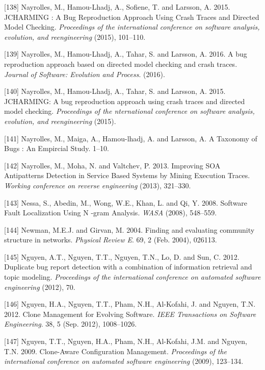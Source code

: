 \documentclass[12pt]{report}
\begin{document}
\hypertarget{ref-Nayrolles2015}{}
{[}138{]} Nayrolles, M., Hamou-Lhadj, A., Sofiene, T. and Larsson, A.
2015. JCHARMING : A Bug Reproduction Approach Using Crash Traces and
Directed Model Checking. \emph{Proceedings of the international
conference on software analysis, evolution, and reengineering} (2015),
101--110.

\hypertarget{ref-Nayrolles2016d}{}
{[}139{]} Nayrolles, M., Hamou-Lhadj, A., Tahar, S. and Larsson, A.
2016. A bug reproduction approach based on directed model checking and
crash traces. \emph{Journal of Software: Evolution and Process}. (2016).

\hypertarget{ref-Nayrolles2015g}{}
{[}140{]} Nayrolles, M., Hamou-Lhadj, A., Tahar, S. and Larsson, A.
2015. JCHARMING: A bug reproduction approach using crash traces and
directed model checking. \emph{Proceedings of the nternational
conference on software analysis, evolution, and reengineering} (2015).

\hypertarget{ref-Nayrolles}{}
{[}141{]} Nayrolles, M., Maiga, A., Hamou-lhadj, A. and Larsson, A. A
Taxonomy of Bugs : An Empircial Study. 1--10.

\hypertarget{ref-Nayrolles2013a}{}
{[}142{]} Nayrolles, M., Moha, N. and Valtchev, P. 2013. Improving SOA
Antipatterns Detection in Service Based Systems by Mining Execution
Traces. \emph{Working conference on reverse engineering} (2013),
321--330.

\hypertarget{ref-Nessa2008}{}
{[}143{]} Nessa, S., Abedin, M., Wong, W.E., Khan, L. and Qi, Y. 2008.
Software Fault Localization Using N -gram Analysis. \emph{WASA} (2008),
548--559.

\hypertarget{ref-Newman2004}{}
{[}144{]} Newman, M.E.J. and Girvan, M. 2004. Finding and evaluating
community structure in networks. \emph{Physical Review E}. 69, 2 (Feb.
2004), 026113.

\hypertarget{ref-Nguyen2012}{}
{[}145{]} Nguyen, A.T., Nguyen, T.T., Nguyen, T.N., Lo, D. and Sun, C.
2012. Duplicate bug report detection with a combination of information
retrieval and topic modeling. \emph{Proceedings of the international
conference on automated software engineering} (2012), 70.

\hypertarget{ref-Nguyen2012a}{}
{[}146{]} Nguyen, H.A., Nguyen, T.T., Pham, N.H., Al-Kofahi, J. and
Nguyen, T.N. 2012. Clone Management for Evolving Software. \emph{IEEE
Transactions on Software Engineering}. 38, 5 (Sep. 2012), 1008--1026.

\hypertarget{ref-Nguyen2009}{}
{[}147{]} Nguyen, T.T., Nguyen, H.A., Pham, N.H., Al-Kofahi, J.M. and
Nguyen, T.N. 2009. Clone-Aware Configuration Management.
\emph{Proceedings of the international conference on automated software
engineering} (2009), 123--134.
\end{document}
